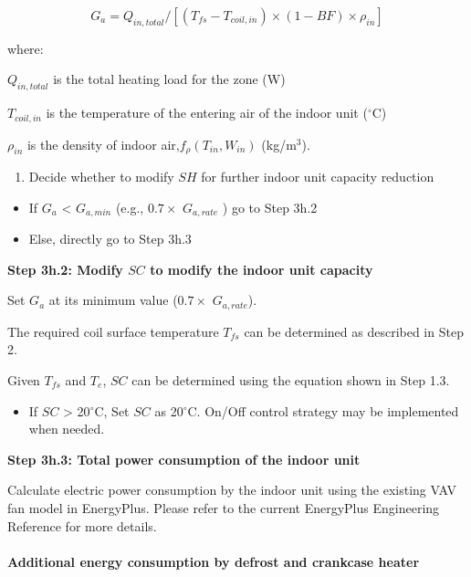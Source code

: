 \begin{equation}
G_a = Q_{in,total}/[(T_{fs}-T_{coil,in})\times{(1-BF)}\times{\rho_{in}}]
\end{equation}

where:

\(Q_{in,total}\) is the total heating load for the zone (W)

\(T_{coil,in}\) is the temperature of the entering air of the indoor unit (\(^{\circ}\)C)

\(\rho_{in}\) is the density of indoor air,\(f_{\rho}(T_{in},W_{in})\) (kg/m\(^{3}\)).

\begin{enumerate}
\def\labelenumi{\arabic{enumi})}
\setcounter{enumi}{2}
\tightlist
\item
  Decide whether to modify \(SH\) for further indoor unit capacity reduction
\end{enumerate}

\begin{itemize}
\item
  If \(G_a\) \textless{} \(G_{a,min}\) (e.g., \(0.7\times\) \(G_{a,rate}\) ) go to Step 3h.2
\item
  Else, directly go to Step 3h.3
\end{itemize}

\textbf{Step 3h.2: Modify \(SC\) to modify the indoor unit capacity}

Set \(G_a\) at its minimum value (\(0.7\times\) \(G_{a,rate}\)).

The required coil surface temperature \(T_{fs}\) can be determined as described in Step 2.

Given \(T_{fs}\) and \(T_e\), \(SC\) can be determined using the equation shown in Step 1.3.

\begin{itemize}
\tightlist
\item
  If \(SC\) \textgreater{} 20\(^{\circ}\)C, Set \(SC\) as 20\(^{\circ}\)C. On/Off control strategy may be implemented when needed.
\end{itemize}

\textbf{Step 3h.3: Total power consumption of the indoor unit}

Calculate electric power consumption by the indoor unit using the existing VAV fan model in EnergyPlus. Please refer to the current EnergyPlus Engineering Reference for more details.

\paragraph{Additional energy consumption by defrost and crankcase heater}\label{additional-energy-consumption-by-defrost-and-crankcase-heater}

